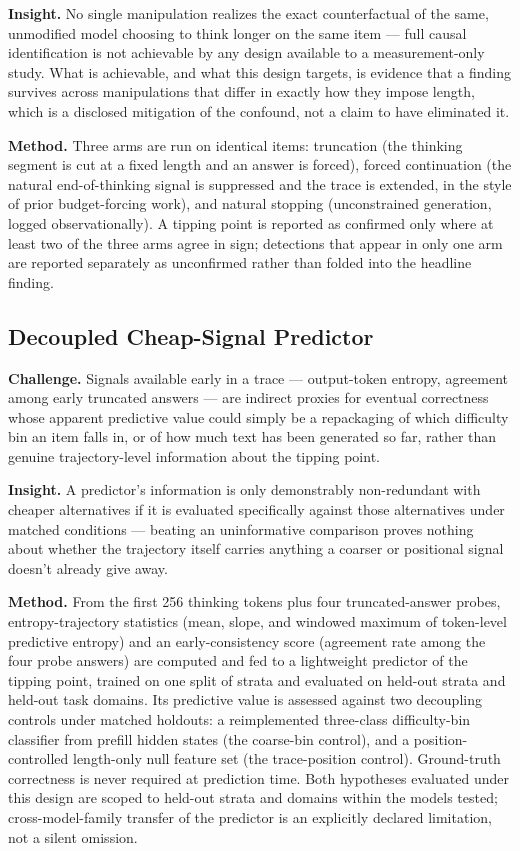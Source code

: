 \documentclass[11pt]{article}
\begin{document}
\textbf{Insight.} No single manipulation realizes the exact counterfactual of the same, unmodified model choosing to think longer on the same item --- full causal identification is not achievable by any design available to a measurement-only study. What is achievable, and what this design targets, is evidence that a finding survives across manipulations that differ in exactly how they impose length, which is a disclosed mitigation of the confound, not a claim to have eliminated it.

\textbf{Method.} Three arms are run on identical items: truncation (the thinking segment is cut at a fixed length and an answer is forced), forced continuation (the natural end-of-thinking signal is suppressed and the trace is extended, in the style of prior budget-forcing work), and natural stopping (unconstrained generation, logged observationally). A tipping point is reported as confirmed only where at least two of the three arms agree in sign; detections that appear in only one arm are reported separately as unconfirmed rather than folded into the headline finding.

\subsection{Decoupled Cheap-Signal Predictor}
\textbf{Challenge.} Signals available early in a trace --- output-token entropy, agreement among early truncated answers --- are indirect proxies for eventual correctness whose apparent predictive value could simply be a repackaging of which difficulty bin an item falls in, or of how much text has been generated so far, rather than genuine trajectory-level information about the tipping point.

\textbf{Insight.} A predictor's information is only demonstrably non-redundant with cheaper alternatives if it is evaluated specifically against those alternatives under matched conditions --- beating an uninformative comparison proves nothing about whether the trajectory itself carries anything a coarser or positional signal doesn't already give away.

\textbf{Method.} From the first 256 thinking tokens plus four truncated-answer probes, entropy-trajectory statistics (mean, slope, and windowed maximum of token-level predictive entropy) and an early-consistency score (agreement rate among the four probe answers) are computed and fed to a lightweight predictor of the tipping point, trained on one split of strata and evaluated on held-out strata and held-out task domains. Its predictive value is assessed against two decoupling controls under matched holdouts: a reimplemented three-class difficulty-bin classifier from prefill hidden states (the coarse-bin control), and a position-controlled length-only null feature set (the trace-position control). Ground-truth correctness is never required at prediction time. Both hypotheses evaluated under this design are scoped to held-out strata and domains within the models tested; cross-model-family transfer of the predictor is an explicitly declared limitation, not a silent omission.
\end{document}
